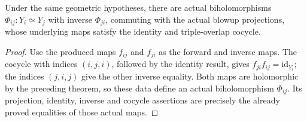 \begin{theorem}
\label{hir:actual-blowup-biholomorphism-cocycle}
\leanok
Under the same geometric hypotheses, there are actual biholomorphisms
$\Phi_{ij}:Y_i\simeq Y_j$ with inverse $\Phi_{ji}$, commuting with the
actual blowup projections, whose underlying maps satisfy the identity
and triple-overlap cocycle.
\end{theorem}
\begin{proof}
Use the produced maps $f_{ij}$ and $f_{ji}$ as the forward and inverse
maps. The cocycle with indices $(i,j,i)$, followed by the identity result,
gives $f_{ji}f_{ij}=\mathrm{id}_{Y_i}$; the indices $(j,i,j)$ give the
other inverse equality. Both maps are holomorphic by the preceding theorem,
so these data define an actual biholomorphism $\Phi_{ij}$. Its projection,
identity, inverse and cocycle assertions are precisely the already proved
equalities of those actual maps.
\end{proof}
